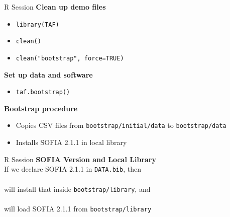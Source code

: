 \documentclass[aspectratio=169]{beamer}
\begin{document}

\begin{frame}[fragile]{R Session}
  \textbf{\darkgreen Clean up demo files}
  \begin{itemize}
    \item[] \verb|library(TAF)|\\[0.5ex]
    \item[] \verb|clean()|\\[0.5ex]
    \item[] \verb|clean("bootstrap", force=TRUE)|\\[1ex]
  \end{itemize}
  \vspace{2ex}
  \textbf{\darkgreen Set up data and software}
  \begin{itemize}
    \item[] \verb|taf.bootstrap()|\\[1ex]
  \end{itemize}
  \vspace{2ex}
  \textbf{\darkgreen Bootstrap procedure}\\[0.3ex]
  \begin{itemize}
    \item[] Copies CSV files from \verb|bootstrap/initial/data| to
    \verb|bootstrap/data|\\[1.2ex]
    \item[] Installs SOFIA 2.1.1 in local library\\[1ex]
  \end{itemize}
\end{frame}


\begin{frame}{R Session}
  \textbf{\darkgreen SOFIA Version and Local Library}\\[1.5ex]
  If we declare SOFIA 2.1.1 in {\tt DATA.bib}, then\\[0.5ex]
  \\[0.5ex]
  will {\darkgreen install} that inside {\tt bootstrap/library}, and\\[0.5ex]
  \\[0.5ex]
  will {\darkgreen load} SOFIA 2.1.1 from {\tt bootstrap/library}
\end{frame}

\end{document}
